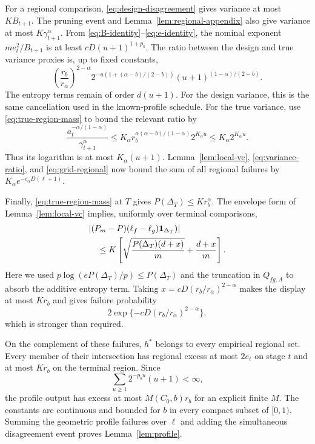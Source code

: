 For a regional comparison, \eqref{eq:design-disagreement} gives variance at most $KB_{t+1}$. The pruning event and Lemma~\ref{lem:regional-appendix} also give variance at most $K\gamma_{t+1}^\alpha$. From \eqref{eq:B-identity}--\eqref{eq:e-identity}, the nominal exponent $me_t^2/B_{t+1}$ is at least $cD(u+1)^{1+p_b}$. The ratio between the design and true variance proxies is, up to fixed constants,
\begin{equation}
 \left(\frac{r_b}{r_\alpha}\right)^{2-\alpha}
 2^{-u(1+(\alpha-b)/(2-b))}
 (u+1)^{(1-\alpha)/(2-b)}.
 \label{eq:variance-ratio}
\end{equation}
The entropy terms remain of order $d(u+1)$. For the design variance, this is the same cancellation used in the known-profile schedule. For the true variance, use \eqref{eq:true-region-mass} to bound the relevant ratio by
\begin{equation}
 \frac{a_t^{-\alpha/(1-\alpha)}}{\gamma_{t+1}^\alpha}
 \leq K_\alpha
 r_b^{\alpha(\alpha-b)/(1-\alpha)}2^{K_\alpha u}
 \leq K_\alpha2^{K_\alpha u}.
 \label{eq:true-entropy-ratio}
\end{equation}
Thus its logarithm is at most $K_\alpha(u+1)$. Lemma~\ref{lem:local-vc}, \eqref{eq:variance-ratio}, and \eqref{eq:grid-regional} now bound the sum of all regional failures by $K_\alpha e^{-c_\alpha D(\ell+1)}$.

Finally, \eqref{eq:true-region-mass} at $T$ gives $P(\Delta_T)\leq K r_b^\alpha$. The envelope form of Lemma~\ref{lem:local-vc} implies, uniformly over terminal comparisons,
\begin{align*}
 &|(P_m-P)(\ell_f-\ell_g)\mathbf 1_{\Delta_T})|\\
 &\quad\leq K\left[\sqrt{\frac{P(\Delta_T)(d+x)}m}
 +\frac{d+x}m\right].
\end{align*}
Here we used $p\log(eP(\Delta_T)/p)\leq P(\Delta_T)$ and the truncation in $Q_{fg,A}$ to absorb the additive entropy term. Taking $x=cD(r_b/r_\alpha)^{2-\alpha}$ makes the display at most $K r_b$ and gives failure probability
\[
 2\exp\{-cD(r_b/r_\alpha)^{2-\alpha}\},
\]
which is stronger than required.

On the complement of these failures, $h^*$ belongs to every empirical regional set. Every member of their intersection has regional excess at most $2e_t$ on stage $t$ and at most $K r_b$ on the terminal region. Since
\[
 \sum_{u\geq1}2^{-p_bu}(u+1)<\infty,
\]
the profile output has excess at most $M(C_0,b)r_b$ for an explicit finite $M$. The constants are continuous and bounded for $b$ in every compact subset of $[0,1)$. Summing the geometric profile failures over $\ell$ and adding the simultaneous disagreement event proves Lemma~\ref{lem:profile}.

